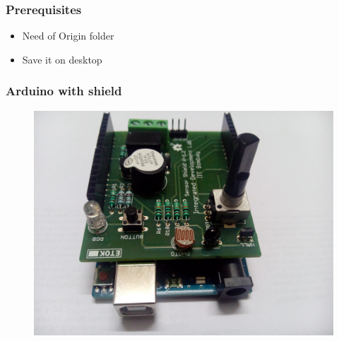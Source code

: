 \documentclass[17pt,xcolor=table]{beamer}
\begin{document}
\begin{frame}[fragile]
\frametitle{Prerequisites}
\begin{itemize}[<+-|alert@+>]
\item Need of Origin folder
\item Save it on desktop
\end{itemize}

\end{frame}


\begin{frame}[fragile]
\frametitle{Arduino with shield}
\begin{figure}
\centering
\begin{minipage}{0.45\textwidth}
\centering
\includegraphics[width=1\linewidth]{arduino-shield-top.jpg}
\end{minipage}
\begin{minipage}{0.45\textwidth}
\centering

\end{minipage}
\end{figure}
\end{frame}
\end{document}

